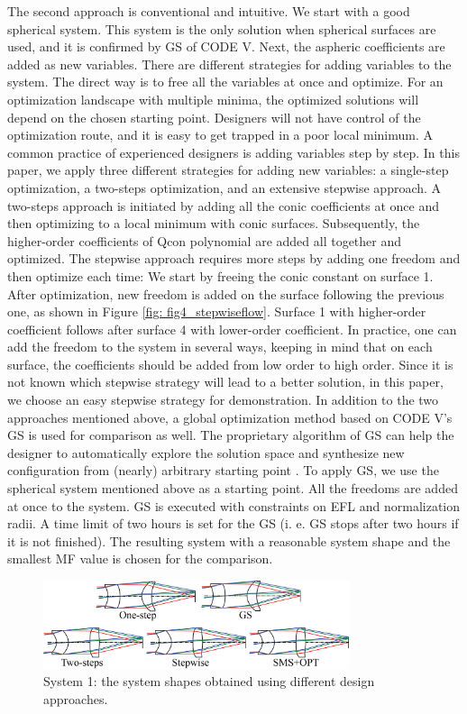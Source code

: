 The second approach is conventional and intuitive. We start with a good spherical system. This system is the only solution when spherical surfaces are used, and it is confirmed by GS of CODE V. Next, the aspheric coefficients are added as new variables. There are different strategies for adding variables to the system. The direct way is to free all the variables at once and optimize. For an optimization landscape with multiple minima, the optimized solutions will depend on the chosen starting point. Designers will not have control of the optimization route, and it is easy to get trapped in a poor local minimum. A common practice of experienced designers is adding variables step by step. In this paper, we apply three different strategies for adding new variables: a single-step optimization, a two-steps optimization, and an extensive stepwise approach. A two-steps approach is initiated by adding all the conic coefficients at once and then optimizing to a local minimum with conic surfaces. Subsequently, the higher-order coefficients of Qcon polynomial are added all together and optimized. The stepwise approach requires more steps by adding one freedom and then optimize each time: We start by freeing the conic constant on surface 1. After optimization, new freedom is added on the surface following the previous one, as shown in Figure \ref{fig: fig4_stepwiseflow}. Surface 1 with higher-order coefficient follows after surface 4 with lower-order coefficient. In practice, one can add the freedom to the system in several ways, keeping in mind that on each surface, the coefficients should be added from low order to high order. Since it is not known which stepwise strategy will lead to a better solution, in this paper, we choose an easy stepwise strategy for demonstration.  
In addition to the two approaches mentioned above, a global optimization method based on CODE V’s GS is used for comparison as well. The proprietary algorithm of GS can help the designer to automatically explore the solution space and synthesize new configuration from (nearly) arbitrary starting point \cite{codevmanual}. To apply GS, we use the spherical system mentioned above as a starting point. All the freedoms are added at once to the system. GS is executed with constraints on EFL and normalization radii. A time limit of two hours is set for the GS (i. e. GS stops after two hours if it is not finished). The resulting system with a reasonable system shape and the smallest MF value is chosen for the comparison. 

\begin{figure}[h!]
    \centering
    \includegraphics[width=0.8\textwidth]{chapter-5/figures/Figure5_system_plot.png}
    \caption{System 1: the system shapes obtained using different design approaches.}
    \label{fig: fig5_case1_systemplot}
\end{figure}


